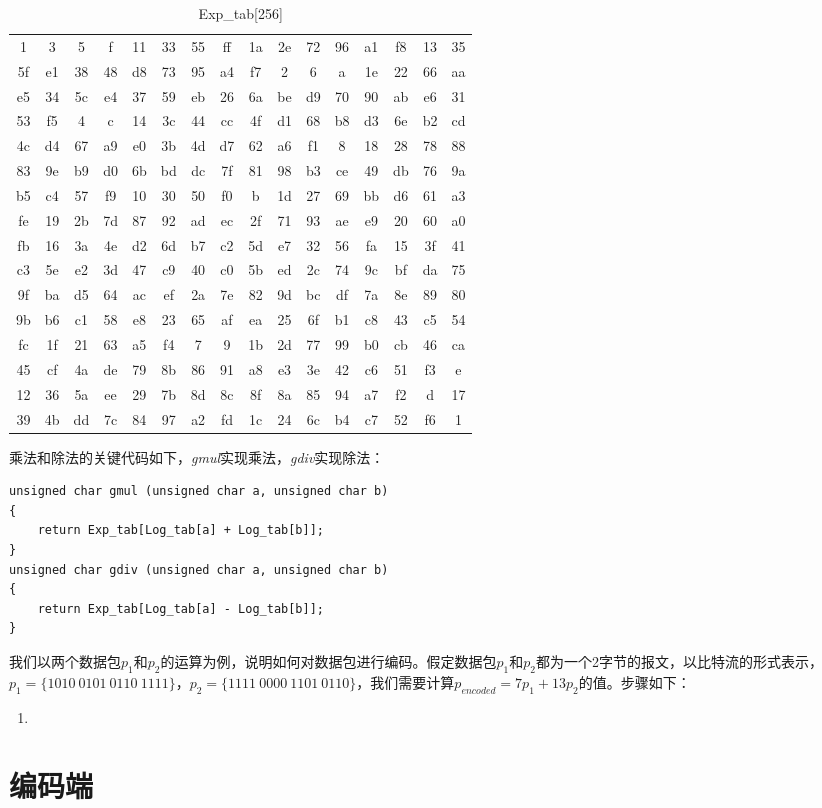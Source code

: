\begin{table}[htb]
	\caption{Exp\_tab[256]}
	\centering
	\begin{tabular}{cccccccccccccccc}
		\toprule
 1& 3& 5& f&11&33&55&ff&1a&2e&72&96&a1&f8&13&35\\
5f&e1&38&48&d8&73&95&a4&f7& 2& 6& a&1e&22&66&aa\\
e5&34&5c&e4&37&59&eb&26&6a&be&d9&70&90&ab&e6&31\\
53&f5& 4& c&14&3c&44&cc&4f&d1&68&b8&d3&6e&b2&cd\\
4c&d4&67&a9&e0&3b&4d&d7&62&a6&f1& 8&18&28&78&88\\
83&9e&b9&d0&6b&bd&dc&7f&81&98&b3&ce&49&db&76&9a\\
b5&c4&57&f9&10&30&50&f0& b&1d&27&69&bb&d6&61&a3\\
fe&19&2b&7d&87&92&ad&ec&2f&71&93&ae&e9&20&60&a0\\
fb&16&3a&4e&d2&6d&b7&c2&5d&e7&32&56&fa&15&3f&41\\
c3&5e&e2&3d&47&c9&40&c0&5b&ed&2c&74&9c&bf&da&75\\
9f&ba&d5&64&ac&ef&2a&7e&82&9d&bc&df&7a&8e&89&80\\
9b&b6&c1&58&e8&23&65&af&ea&25&6f&b1&c8&43&c5&54\\
fc&1f&21&63&a5&f4& 7& 9&1b&2d&77&99&b0&cb&46&ca\\
45&cf&4a&de&79&8b&86&91&a8&e3&3e&42&c6&51&f3& e\\
12&36&5a&ee&29&7b&8d&8c&8f&8a&85&94&a7&f2& d&17\\
39&4b&dd&7c&84&97&a2&fd&1c&24&6c&b4&c7&52&f6& 1\\
		\bottomrule
	\end{tabular}
	\label{Exptab}
\end{table}
乘法和除法的关键代码如下，\emph{gmul}实现乘法，\emph{gdiv}实现除法：
\begin{lstlisting}[language={[ANSI]C}]
unsigned char gmul (unsigned char a, unsigned char b)
{
	return Exp_tab[Log_tab[a] + Log_tab[b]];
}
unsigned char gdiv (unsigned char a, unsigned char b)
{
	return Exp_tab[Log_tab[a] - Log_tab[b]];
}
\end{lstlisting}
\par
我们以两个数据包$p_{1}$和$p_{2}$的运算为例，说明如何对数据包进行编码。假定数据包$p_{1}$和$p_{2}$都为一个2字节的报文，以比特流的形式表示，$p_{1}=\{1010\ 0101\ 0110\ 1111\}$，$p_{2}=\{1111\ 0000\ 1101\ 0110\}$，我们需要计算$p_{encoded}=7p_{1}+13p_{2}$的值。步骤如下：
\begin{enumerate}[fullwidth,itemindent=2em,label=(\arabic*)]
	\item 
\end{enumerate}
\par
\section{编码端}


